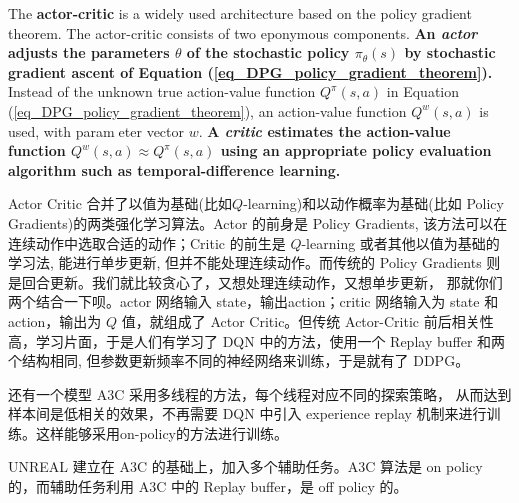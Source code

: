 The {\bf actor-critic} is a widely used architecture based on the
policy gradient theorem. The actor-critic consists of two eponymous 
components. {\bf An \emph{actor} adjusts the parameters $\theta$ of the 
stochastic policy $\pi_\theta(s)$ by stochastic gradient ascent of 
Equation (\ref{eq_DPG_policy_gradient_theorem}).} Instead of the
unknown true action-value function $Q^\pi(s,a)$ in Equation 
(\ref{eq_DPG_policy_gradient_theorem}), an action-value function 
$Q^w(s, a)$ is used, with parameter vector $w$. {\bf A \emph{critic} 
estimates the action-value function $Q^w(s,a)\approx Q^\pi(s,a)$ 
using an appropriate policy evaluation algorithm such as 
temporal-difference learning.}

Actor Critic 合并了以值为基础(比如$Q$-learning)和以动作概率为基础(比如 Policy 
Gradients)的两类强化学习算法。Actor 的前身是 Policy Gradients, 
该方法可以在连续动作中选取合适的动作；Critic 的前生是 $Q$-learning 
或者其他以值为基础的学习法, 能进行单步更新, 但并不能处理连续动作。而传统的 Policy 
Gradients 则是回合更新。我们就比较贪心了，又想处理连续动作，又想单步更新，
那就你们两个结合一下呗。actor 网络输入 state，输出action；critic 网络输入为 state
和 action，输出为 $Q$ 值，就组成了 Actor Critic。但传统 Actor-Critic 
前后相关性高，学习片面，于是人们有学习了 DQN 中的方法，使用一个 Replay buffer 
和两个结构相同, 但参数更新频率不同的神经网络来训练，于是就有了 DDPG。

还有一个模型 A3C 采用多线程的方法，每个线程对应不同的探索策略，
从而达到样本间是低相关的效果，不再需要 DQN 中引入 experience replay 
机制来进行训练。这样能够采用on-policy的方法进行训练。

UNREAL 建立在 A3C 的基础上，加入多个辅助任务。A3C 算法是 on policy 
的，而辅助任务利用 A3C 中的 Replay buffer，是 off policy 的。

